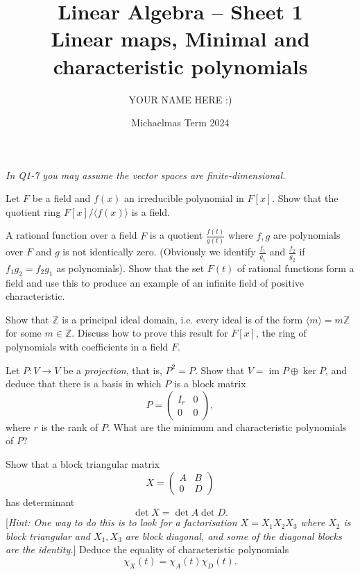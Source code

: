\documentclass[answers]{exam}
\title{Linear Algebra -- Sheet 1\\Linear maps, Minimal and characteristic polynomials}
\author{YOUR NAME HERE :)}
\date{Michaelmas Term 2024}
\begin{document}
\maketitle

\emph{In Q1-7 you may assume the vector spaces are finite-dimensional.}

\begin{questions}

\question%
Let $F$ be a field and $f(x)$ an irreducible polynomial in $F[x]$. Show that the quotient ring $F[x] /\langle f(x)\rangle$ is a field.



\question%
A rational function over a field $F$ is a quotient $\frac{f(t)}{g(t)}$ where $f, g$ are polynomials over $F$ and $g$ is not identically zero. (Obviously we identify $\frac{f_{1}}{g_{1}}$ and $\frac{f_{2}}{g_{2}}$ if $f_{1} g_{2}=f_{2} g_{1}$ as polynomials). Show that the set $F(t)$ of rational functions form a field and use this to produce an example of an infinite field of positive characteristic.



\question%
Show that $\mathbb{Z}$ is a principal ideal domain, i.e. every ideal is of the form $\langle m\rangle=m \mathbb{Z}$ for some $m \in \mathbb{Z}$. Discuss how to prove this result for $F[x]$, the ring of polynomials with coefficients in a field $F$.



\question%
Let $P: V \to V$ be a \emph{projection}, that is, $P^{2}=P$. Show that $V=\operatorname{im} P \oplus \ker P$, and deduce that there is a basis in which $P$ is a block matrix \[
	P=\begin{pmatrix}
		I_{r} & 0 \\
		0 & 0
	\end{pmatrix},
\] where $r$ is the rank of $P$. What are the minimum and characteristic polynomials of $P$?



\question%
Show that a block triangular matrix \[
	X=\begin{pmatrix}
		A & B \\
		0 & D
	\end{pmatrix}
\] has determinant \[
	\det X=\det A \det D.
\] [\emph{Hint: One way to do this is to look for a factorisation $X=X_{1} X_{2} X_{3}$ where $X_{2}$ is block triangular and $X_{1}, X_{3}$ are block diagonal, and some of the diagonal blocks are the identity.}] Deduce the equality of characteristic polynomials \[
	\chi_{X}(t)=\chi_{A}(t) \chi_{D}(t).
\]




\end{questions}
\end{document}
